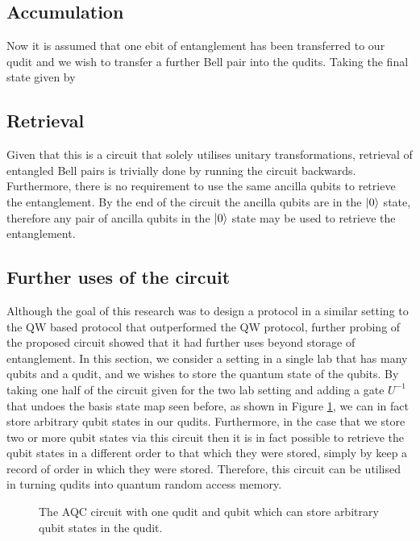 \subsection{Accumulation}
\label{subsection:accumulation}
Now it is assumed that one ebit of entanglement has been transferred to our qudit and we wish to transfer a further Bell pair into the qudits. Taking the final state given by 
\subsection{Retrieval}
\label{subsection:aqcretrieval}
Given that this is a circuit that solely utilises unitary transformations, retrieval of entangled Bell pairs is trivially done by running the circuit backwards. Furthermore, there is no requirement to use the same ancilla qubits to retrieve the entanglement. By the end of the circuit the ancilla qubits are in the $\ket{0}$ state, therefore any pair of ancilla qubits in the $\ket{0}$ state may be used to retrieve the entanglement.

\subsection{Further uses of the circuit}
\label{subsection:furtheruses}
Although the goal of this research was to design a protocol in a similar setting to the QW based protocol that outperformed the QW protocol, further probing of the proposed circuit showed that it had further uses beyond storage of entanglement.
In this section, we consider a setting in a single lab that has many qubits and a qudit, and we wishes to store the quantum state of the qubits.
By taking one half of the circuit given for the two lab setting and adding a gate $U^{-1}$ that undoes the basis state map seen before, as shown in Figure \ref{fig:aqc_qbit_store}, we can in fact store arbitrary qubit states in our qudits.
Furthermore, in the case that we store two or more qubit states via this circuit then it is in fact possible to retrieve the qubit states in a different order to that which they were stored, simply by keep a record of order in which they were stored.
Therefore, this circuit can be utilised in turning qudits into quantum random access memory.

\begin{figure}
    \begin{center}
    \caption{The AQC circuit with one qudit and qubit which can store arbitrary qubit states in the qudit.}
    \label{fig:aqc_qbit_store}
    \end{center}
\end{figure}

